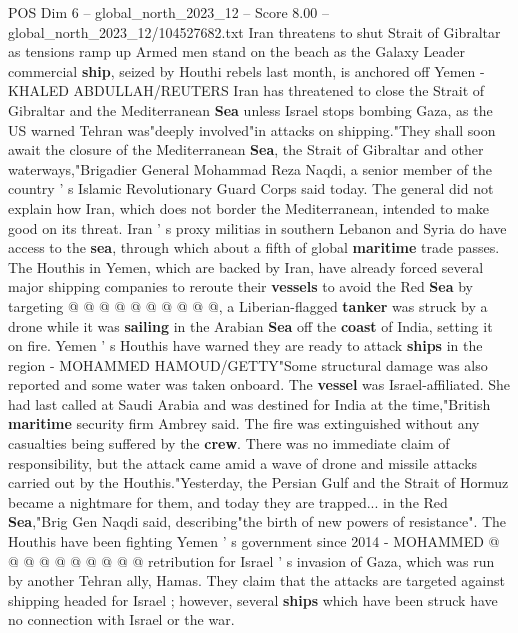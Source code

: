 \begin{textsample}{POS Dim 6 – global\_north\_2023\_12 – Score 8.00 – global\_north\_2023\_12/104527682.txt}  \label{ex:f6_pos_139}
Iran threatens to shut Strait of Gibraltar as tensions ramp up Armed men stand on the beach as the Galaxy Leader commercial \textbf{ship}, seized by Houthi rebels last month, is anchored off Yemen - KHALED ABDULLAH/REUTERS Iran has threatened to close the Strait of Gibraltar and the Mediterranean \textbf{Sea} unless Israel stops bombing Gaza, as the US warned Tehran was"deeply involved"in attacks on shipping."They shall soon await the closure of the Mediterranean \textbf{Sea}, the Strait of Gibraltar and other waterways,"Brigadier General Mohammad Reza Naqdi, a senior member of the country ' s Islamic Revolutionary Guard Corps said today.
The general did not explain how Iran, which does not border the Mediterranean, intended to make good on its threat.
Iran ' s proxy militias in southern Lebanon and Syria do have access to the \textbf{sea}, through which about a fifth of global \textbf{maritime} trade passes.
The Houthis in Yemen, which are backed by Iran, have already forced several major shipping companies to reroute their \textbf{vessels} to avoid the Red \textbf{Sea} by targeting @ @ @ @ @ @ @ @ @ @, a Liberian-flagged \textbf{tanker} was struck by a drone while it was \textbf{sailing} in the Arabian \textbf{Sea} off the \textbf{coast} of India, setting it on fire.
Yemen ' s Houthis have warned they are ready to attack \textbf{ships} in the region - MOHAMMED HAMOUD/GETTY"Some structural damage was also reported and some water was taken onboard.
The \textbf{vessel} was Israel-affiliated.
She had last called at Saudi Arabia and was destined for India at the time,"British \textbf{maritime} security firm Ambrey said.
The fire was extinguished without any casualties being suffered by the \textbf{crew}.
There was no immediate claim of responsibility, but the attack came amid a wave of drone and missile attacks carried out by the Houthis."Yesterday, the Persian Gulf and the Strait of Hormuz became a nightmare for them, and today they are trapped... in the Red \textbf{Sea},"Brig Gen Naqdi said, describing"the birth of new powers of resistance".
The Houthis have been fighting Yemen ' s government since 2014 - MOHAMMED @ @ @ @ @ @ @ @ @ @ retribution for Israel ' s invasion of Gaza, which was run by another Tehran ally, Hamas.
They claim that the attacks are targeted against shipping headed for Israel ; however, several \textbf{ships} which have been struck have no connection with Israel or the war.

\end{textsample}
